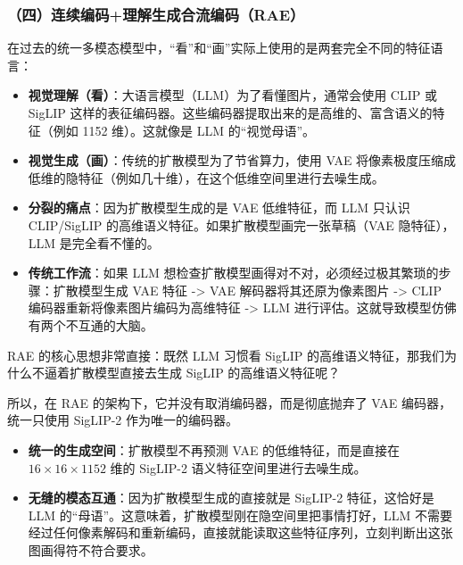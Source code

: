\hypertarget{ux56dbux8fdeux7eedux7f16ux7801ux7406ux89e3ux751fux6210ux5408ux6d41ux7f16ux7801rae}{%
\subsubsection{（四）连续编码+理解生成合流编码（RAE）}\label{ux56dbux8fdeux7eedux7f16ux7801ux7406ux89e3ux751fux6210ux5408ux6d41ux7f16ux7801rae}}

在过去的统一多模态模型中，``看''和``画''实际上使用的是两套完全不同的特征语言：

\begin{itemize}
\item
  \textbf{视觉理解（看）}：大语言模型（LLM）为了看懂图片，通常会使用 CLIP 或 SigLIP 这样的表征编码器。这些编码器提取出来的是高维的、富含语义的特征（例如 1152 维）。这就像是 LLM 的``视觉母语''。
\item
  \textbf{视觉生成（画）}：传统的扩散模型为了节省算力，使用 VAE 将像素极度压缩成低维的隐特征（例如几十维），在这个低维空间里进行去噪生成。
\item
  \textbf{分裂的痛点}：因为扩散模型生成的是 VAE 低维特征，而 LLM 只认识 CLIP/SigLIP 的高维语义特征。如果扩散模型画完一张草稿（VAE 隐特征），LLM 是完全看不懂的。
\item
  \textbf{传统工作流}：如果 LLM 想检查扩散模型画得对不对，必须经过极其繁琐的步骤：扩散模型生成 VAE 特征 -\textgreater{} VAE 解码器将其还原为像素图片 -\textgreater{} CLIP 编码器重新将像素图片编码为高维特征 -\textgreater{} LLM 进行评估。这就导致模型仿佛有两个不互通的大脑。
\end{itemize}

RAE 的核心思想非常直接：既然 LLM 习惯看 SigLIP 的高维语义特征，那我们为什么不逼着扩散模型直接去生成 SigLIP 的高维语义特征呢？

所以，在 RAE 的架构下，它并没有取消编码器，而是彻底抛弃了 VAE 编码器，统一只使用 SigLIP-2 作为唯一的编码器。

\begin{itemize}
\tightlist
\item
  \textbf{统一的生成空间}：扩散模型不再预测 VAE 的低维特征，而是直接在 \(16\times16\times1152\) 维的 SigLIP-2 语义特征空间里进行去噪生成。
\item
  \textbf{无缝的模态互通}：因为扩散模型生成的直接就是 SigLIP-2 特征，这恰好是 LLM 的``母语''。这意味着，扩散模型刚在隐空间里把事情打好，LLM 不需要经过任何像素解码和重新编码，直接就能读取这些特征序列，立刻判断出这张图画得符不符合要求。
\end{itemize}

